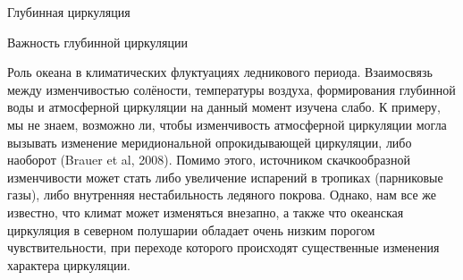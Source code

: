 \begin{chapter}{Глубинная циркуляция}
\begin{section}{Важность глубинной циркуляции}
\begin{paragraph}{Роль океана в климатических флуктуациях ледникового периода.}
Взаимосвязь между изменчивостью солёности, температуры воздуха, формирования
глубинной воды и атмосферной циркуляции на данный момент изучена слабо.
К примеру, мы не знаем, возможно ли, чтобы изменчивость атмосферной циркуляции
могла вызывать изменение меридиональной опрокидывающей циркуляции, 
либо наоборот (Brauer et al, 2008). Помимо этого, источником скачкообразной
изменчивости может стать либо увеличение испарений в тропиках (парниковые газы),
либо внутренняя нестабильность ледяного покрова. Однако, нам все же известно,
что климат может изменяться внезапно, а также что океанская циркуляция 
в северном полушарии обладает очень низким порогом чувствительности, при
переходе которого происходят существенные изменения характера циркуляции. 
%


\end{paragraph}
\end{section}
\end{chapter}

